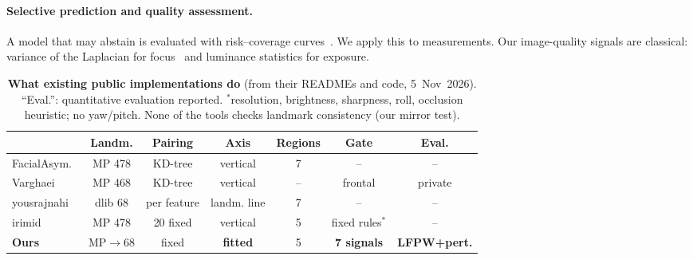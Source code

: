 \paragraph{Selective prediction and quality assessment.}
A model that may abstain is evaluated with risk--coverage curves~\cite{geifman2017selective}.
We apply this to measurements. Our image-quality signals are classical: variance of the
Laplacian for focus~\cite{pertuz2013focus} and luminance statistics for exposure.

\begin{table}[t]
\centering\footnotesize
\setlength{\tabcolsep}{2.5pt}
\begin{tabular}{@{}lcccccc@{}}
\toprule
 & Landm. & Pairing & Axis & Regions & Gate & Eval.\\
\midrule
FacialAsym.~\cite{nashokan_facialasymmetry} & MP 478 & KD-tree & vertical & 7 & -- & --\\
Varghaei~\cite{varghaei2025aesthetic} & MP 468 & KD-tree & vertical & -- & frontal & private\\
yousrajnahi~\cite{yousrajnahi_symmetry} & dlib 68 & per feature & landm. line & 7 & -- & --\\
irimid~\cite{irimid} & MP 478 & 20 fixed & vertical & 5 & fixed rules$^{*}$ & --\\
\textbf{Ours} & MP$\to$68 & fixed & \textbf{fitted} & 5 & \textbf{7 signals} & \textbf{LFPW+pert.}\\
\bottomrule
\end{tabular}
\caption{\textbf{What existing public implementations do} (from their READMEs and code,
5~Nov~2026). ``Eval.'': quantitative evaluation reported. $^{*}$resolution, brightness,
sharpness, roll, occlusion heuristic; no yaw/pitch. None of the tools checks landmark
consistency (our mirror test).}
\label{tab:related}
\end{table}
